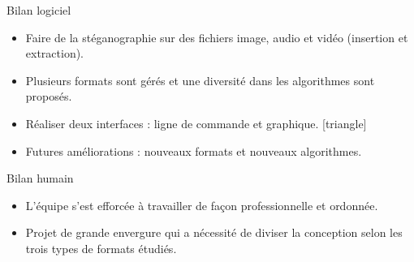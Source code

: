 \documentclass{beamer}
\begin{document}
  \begin{frame}
  
	\begin{block}{Bilan logiciel}
	\begin{itemize}
	[circle]
	\item Faire de la stéganographie sur des fichiers image, audio et vidéo
	(insertion et extraction). \checkmark
	\item Plusieurs formats sont gérés et une diversité dans les algorithmes 
	sont proposés. \checkmark
	\item Réaliser deux interfaces : ligne de commande et graphique. \checkmark
{}[triangle]
	\item Futures améliorations : nouveaux formats et nouveaux algorithmes. 

\end{itemize}
	
	\end{block}
	
	\begin{block}{Bilan humain}
	\begin{itemize}
	[circle]
	\item L'équipe s'est efforcée à travailler de façon professionnelle et ordonnée.
	\item Projet de grande envergure qui a nécessité de diviser la conception 
	selon les trois types de formats étudiés.  
	\end{itemize}
	\end{block}

	\end{frame}
  
  
\end{document}
